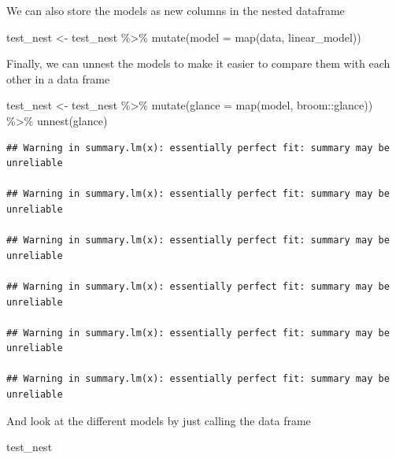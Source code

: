 \documentclass[
]{book}
\newenvironment{Shaded}{\begin{snugshade}}{\end{snugshade}}
\newcommand{\AttributeTok}[1]{\textcolor[rgb]{0.77,0.63,0.00}{#1}}
\newcommand{\FunctionTok}[1]{\textcolor[rgb]{0.00,0.00,0.00}{#1}}
\newcommand{\NormalTok}[1]{#1}
\newcommand{\OtherTok}[1]{\textcolor[rgb]{0.56,0.35,0.01}{#1}}
\newcommand{\SpecialCharTok}[1]{\textcolor[rgb]{0.00,0.00,0.00}{#1}}
\begin{document}
We can also store the models as new columns in the nested dataframe

\begin{Shaded}
\begin{Highlighting}[]
\NormalTok{test\_nest }\OtherTok{\textless{}{-}}\NormalTok{ test\_nest }\SpecialCharTok{\%\textgreater{}\%} 
  \FunctionTok{mutate}\NormalTok{(}\AttributeTok{model =} \FunctionTok{map}\NormalTok{(data, linear\_model))}
\end{Highlighting}
\end{Shaded}

Finally, we can unnest the models to make it easier to compare them with each other in a data frame

\begin{Shaded}
\begin{Highlighting}[]
\NormalTok{test\_nest }\OtherTok{\textless{}{-}}\NormalTok{ test\_nest }\SpecialCharTok{\%\textgreater{}\%} 
  \FunctionTok{mutate}\NormalTok{(}\AttributeTok{glance =} \FunctionTok{map}\NormalTok{(model, broom}\SpecialCharTok{::}\NormalTok{glance)) }\SpecialCharTok{\%\textgreater{}\%} 
  \FunctionTok{unnest}\NormalTok{(glance)}
\end{Highlighting}
\end{Shaded}

\begin{verbatim}
## Warning in summary.lm(x): essentially perfect fit: summary may be unreliable

## Warning in summary.lm(x): essentially perfect fit: summary may be unreliable

## Warning in summary.lm(x): essentially perfect fit: summary may be unreliable

## Warning in summary.lm(x): essentially perfect fit: summary may be unreliable

## Warning in summary.lm(x): essentially perfect fit: summary may be unreliable

## Warning in summary.lm(x): essentially perfect fit: summary may be unreliable
\end{verbatim}

And look at the different models by just calling the data frame

\begin{Shaded}
\begin{Highlighting}[]
\NormalTok{test\_nest}
\end{Highlighting}
\end{Shaded}
\end{document}
